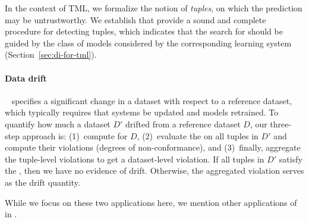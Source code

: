  In the context of TML, we formalize the notion of \emph{\nc
tuples}, on which the prediction may be untrustworthy. We establish that \dis
provide a sound and complete procedure for detecting \nc tuples, which
indicates that the search for \dis should be guided by the class of models
considered by the corresponding learning system (Section~\ref{sec:di-for-tml}).



\smallskip

\paragraph{Data drift}~\cite{DBLP:conf/kdd/QahtanAWZ15,
DBLP:journals/tnn/KunchevaF14, DBLP:journals/csur/GamaZBPB14,
DBLP:journals/jss/BarddalGEP17} specifies a significant change in a dataset
with respect to a reference dataset, which typically requires that systems be
updated and models retrained.
To quantify how much a dataset $D'$ drifted from a reference dataset $D$, our
three-step approach is: (1)~compute \dis for $D$, (2)~evaluate the \invariants
on all tuples in $D'$ and compute their violations (degrees of
non-conformance), and (3)~finally, aggregate the tuple-level violations to get
a dataset-level violation. If all tuples in $D'$ satisfy the \invariants, then
we have no evidence of drift. Otherwise, the aggregated violation serves as the
drift quantity.

\smallskip

While we focus on these two applications here, we mention other applications of
\dis in \appOrTechRep.






